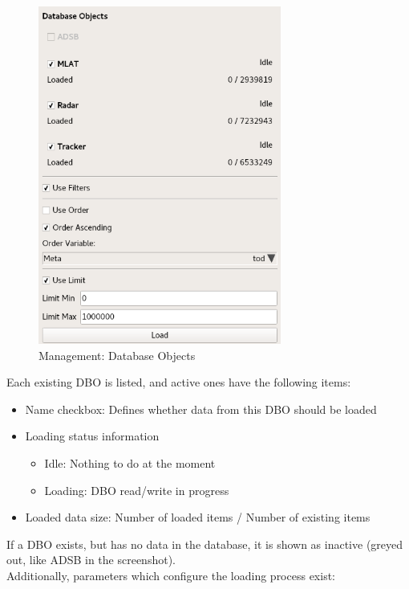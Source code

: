 \documentclass[10pt,letterpaper,extrafontsizes]{memoir}
\begin{document}
\begin{figure}[H]
  \center
    \includegraphics[width=8cm]{../screenshots/management_dbos.png}
  \caption{Management: Database Objects}
  \label{fig:management_objects}
\end{figure}

Each existing DBO is listed, and active ones have the following items:

\begin{itemize}
 \item Name checkbox: Defines whether data from this DBO should be loaded
 \item Loading status information
  \begin{itemize}
  \item Idle: Nothing to do at the moment
  \item Loading: DBO read/write in progress
  \end{itemize}
 \item Loaded data size: Number of loaded items / Number of existing items
\end{itemize}

If a DBO exists, but has no data in the database, it is shown as inactive (greyed out, like ADSB in the screenshot).\\

Additionally, parameters which configure the loading process exist:
\end{document}
